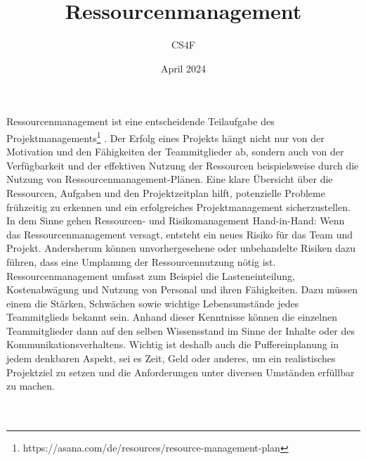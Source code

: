 \documentclass[a4paper]{article}
\title{\vspace{-2cm}Ressourcenmanagement}
\author{CS4F}
\date{April 2024}
\begin{document}
\maketitle


Ressourcenmanagement ist eine entscheidende Teilaufgabe des Projektmanagements\footnote{https://asana.com/de/resources/resource-management-plan}
. Der Erfolg eines Projekts hängt nicht nur von der Motivation und den Fähigkeiten der Teammitglieder ab, sondern auch von der Verfügbarkeit und der effektiven Nutzung der Ressourcen beispielsweise durch die Nutzung von Ressourcenmanagement-Plänen. Eine klare Übersicht über die Ressourcen, Aufgaben und den Projektzeitplan hilft, potenzielle Probleme frühzeitig zu erkennen und ein erfolgreiches Projektmanagement sicherzustellen.
In dem Sinne gehen Ressourcen- und Risikomanagement Hand-in-Hand: Wenn das Ressourcenmanagement versagt, entsteht ein neues Risiko für das Team und Projekt. Andersherum können unvorhergesehene oder unbehandelte Risiken dazu führen, dass eine Umplanung der Ressourcennutzung nötig ist. \\

Ressourcenmanagement umfasst zum Beispiel die Lasteneinteilung, Kostenabwägung und Nutzung von Personal und ihren Fähigkeiten. Dazu müssen einem die Stärken, Schwächen sowie wichtige Lebensumstände jedes Teammitglieds bekannt sein. Anhand dieser Kenntnisse können die einzelnen Teammitglieder dann auf den selben Wissensstand im Sinne der Inhalte oder des Kommunikationsverhaltens. Wichtig ist deshalb auch die Puffereinplanung in jedem denkbaren Aspekt, sei es Zeit, Geld oder anderes, um ein realistisches Projektziel zu setzen und die Anforderungen unter diversen Umständen erfüllbar zu machen.\\\\\\
\end{document}
